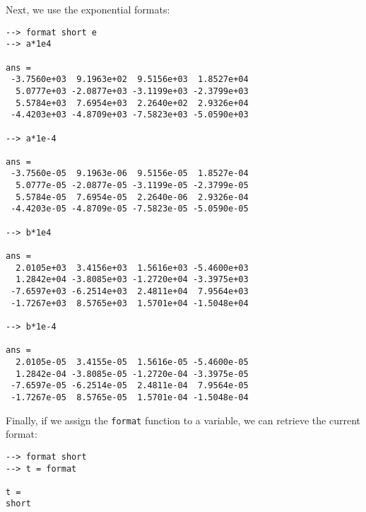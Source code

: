 Next, we use the exponential formats:
\begin{verbatim}
--> format short e
--> a*1e4

ans = 
 -3.7560e+03  9.1963e+02  9.5156e+03  1.8527e+04 
  5.0777e+03 -2.0877e+03 -3.1199e+03 -2.3799e+03 
  5.5784e+03  7.6954e+03  2.2640e+02  2.9326e+04 
 -4.4203e+03 -4.8709e+03 -7.5823e+03 -5.0590e+03 

--> a*1e-4

ans = 
 -3.7560e-05  9.1963e-06  9.5156e-05  1.8527e-04 
  5.0777e-05 -2.0877e-05 -3.1199e-05 -2.3799e-05 
  5.5784e-05  7.6954e-05  2.2640e-06  2.9326e-04 
 -4.4203e-05 -4.8709e-05 -7.5823e-05 -5.0590e-05 

--> b*1e4

ans = 
  2.0105e+03  3.4156e+03  1.5616e+03 -5.4600e+03 
  1.2842e+04 -3.8085e+03 -1.2720e+04 -3.3975e+03 
 -7.6597e+03 -6.2514e+03  2.4811e+04  7.9564e+03 
 -1.7267e+03  8.5765e+03  1.5701e+04 -1.5048e+04 

--> b*1e-4

ans = 
  2.0105e-05  3.4155e-05  1.5616e-05 -5.4600e-05 
  1.2842e-04 -3.8085e-05 -1.2720e-04 -3.3975e-05 
 -7.6597e-05 -6.2514e-05  2.4811e-04  7.9564e-05 
 -1.7267e-05  8.5765e-05  1.5701e-04 -1.5048e-04 
\end{verbatim}
Finally, if we assign the \verb|format| function to a variable, we can retrieve the 
current format:
\begin{verbatim}
--> format short
--> t = format

t = 
short
\end{verbatim}
